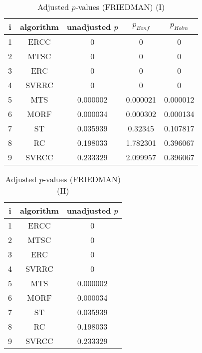 \documentclass[a4paper,10pt]{article}
\begin{document}
\begin{landscape}
\begin{table}[!htp]
\centering\small
\begin{tabular}{ccccc}
i&algorithm&unadjusted $p$&$p_{Bonf}$&$p_{Holm}$\\
\hline1&ERCC&0&0&0\\2&MTSC&0&0&0\\3&ERC&0&0&0\\4&SVRRC&0&0&0\\5&MTS&0.000002&0.000021&0.000012\\6&MORF&0.000034&0.000302&0.000134\\7&ST&0.035939&0.32345&0.107817\\8&RC&0.198033&1.782301&0.396067\\9&SVRCC&0.233329&2.099957&0.396067\\\hline
\end{tabular}
\caption{Adjusted $p$-values (FRIEDMAN) (I)}
\end{table}
\begin{table}[!htp]
\centering\small
\begin{tabular}{ccc}
i&algorithm&unadjusted $p$\\
\hline1&ERCC&0\\2&MTSC&0\\3&ERC&0\\4&SVRRC&0\\5&MTS&0.000002\\6&MORF&0.000034\\7&ST&0.035939\\8&RC&0.198033\\9&SVRCC&0.233329\\\hline
\end{tabular}
\caption{Adjusted $p$-values (FRIEDMAN) (II)}
\end{table}

\newpage
\end{landscape}
\end{document}
